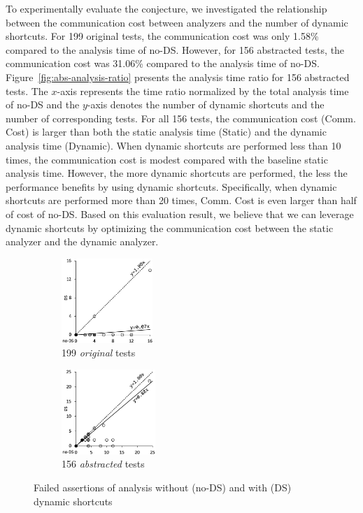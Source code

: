 To experimentally evaluate the conjecture, we investigated the relationship between
the communication cost between analyzers and the number of dynamic shortcuts.
For 199 original tests, the communication cost was only
1.58\% compared to the analysis time of no-DS.  However, for 156
abstracted tests, the communication cost was 31.06\% compared to the analysis
time of no-DS.  Figure~\ref{fig:abs-analysis-ratio} presents the
analysis time ratio for 156 abstracted tests.
The $x$-axis represents the time ratio normalized by the total analysis time of
no-DS and the $y$-axis denotes the number of dynamic
shortcuts and the number of corresponding tests.
For all 156 tests, the communication cost (Comm. Cost) is larger than
both the static analysis time (Static) and the dynamic analysis
time (Dynamic).  When dynamic shortcuts are performed less than 10 times,
the communication cost is modest compared with the baseline static
analysis time.  However, the more dynamic shortcuts are performed,
the less the performance benefits by using dynamic shortcuts.
Specifically, when dynamic shortcuts are performed more than 20 times,
Comm. Cost is even larger than half of cost of no-DS.
Based on this evaluation result, we believe that we can leverage
dynamic shortcuts by optimizing the communication cost between
the static analyzer and the dynamic analyzer.

\begin{figure}[t]
  \centering
  \begin{subfigure}[t]{0.23\textwidth}
    \includegraphics[height=3.2cm]{img/conc-precision}
    \vspace*{-0.7em}
    \caption{199 \textit{original} tests}
    \label{fig:conc-precision}
  \end{subfigure}
  \begin{subfigure}[t]{0.23\textwidth}
    \includegraphics[height=3.2cm]{img/abs-precision}
    \vspace*{-0.7em}
    \caption{156 \textit{abstracted} tests}
    \label{fig:abs-precision}
  \end{subfigure}
  \vspace*{-1em}
  \caption{Failed assertions of analysis without (no-DS) and with (DS) dynamic shortcuts}
  \label{fig:precision}
  \vspace*{-1.5em}
\end{figure}



